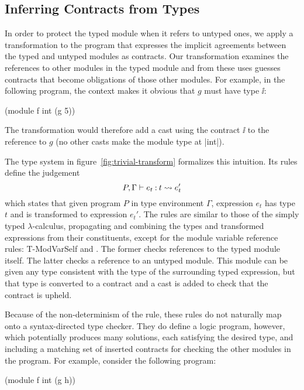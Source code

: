 \begin{schemeregion}
\subsection{Inferring Contracts from Types}

In order to protect the typed module when it refers to untyped ones,
we apply a transformation to the program that expresses the implicit
agreements between the typed and untyped modules as contracts.
  Our transformation
examines the references to other modules in the typed module and from these uses
guesses contracts that become obligations of those other modules.  For
example, in the following program, the context makes it obvious that
$g$ must have type $\ii$:
\begin{schemedisplay}
(module f int (g 5))
\end{schemedisplay}
The transformation would therefore add a cast using the contract $\ii$ to the
reference to $g$ (no other casts make the module type at \scheme|int|).



The type system in figure~\ref{fig:trivial-transform} formalizes this
intuition.  Its rules define the judgement
$$P,\Gamma \vdash {\ensuremath{e_t \mathbin{:} t}} \rightsquigarrow e_t'$$ which states that given program $P$ in type environment
$\Gamma$, expression $e_t$ has type $t$ and is transformed to expression
$e_t'$. 
The rules are similar to those of the simply typed
$\lambda$-calculus, propagating and combining the
types and transformed expressions from their constituents, except
for the module variable reference rules: {\sc T-ModVarSelf} and
{}.  The former  checks references to the typed
module itself.  The latter checks a reference to an untyped module.
This module can be given any type consistent with the type of the
surrounding typed expression, but that type is converted to a contract
and a cast is added to check that the contract is upheld.

Because of the non-determinism of the {} rule, these rules do not
naturally map onto a syntax-directed type checker.
They do define a logic program, however, which potentially produces
many solutions, each satisfying the desired type, and including a
matching set of inserted contracts for checking the other modules in
the program.  For example, consider the following program:

\begin{schemedisplay}
(module f int (g h))  
\end{schemedisplay}


\end{schemeregion}
